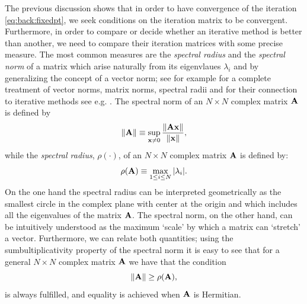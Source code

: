 The previous discussion shows that in order to have convergence of the iteration \eqref{eq:back:fixedpt}, we seek conditions on the iteration matrix to be convergent. Furthermore, in order to compare or decide whether an iterative method is better than another, we need to compare their iteration matrices with some precise measure. The most common measures are the \emph{spectral radius} and the \emph{spectral norm} of a matrix which arise naturally from its eigenvlaues $\lambda_i$ and by generalizing the concept of a vector norm; see for example \cite{HorJoh91} for a complete treatment of vector norms, matrix norms, spectral radii and for their connection to iterative methods see e.g. \cite{Ste01}. The spectral norm of an $N\times N$ complex matrix $\mathbf{A}$ is defined by
\begin{equation*}
\|\mathbf{A}\|\equiv\sup_{\mathbf{x}\neq 0}\frac{\|\mathbf{A}\mathbf{x}\|}{\|\mathbf{x}\|},
\end{equation*}
while the \emph{spectral radius}, $\rho(\cdot)$, of an $N\times N$ complex matrix $\mathbf{A}$ is defined by:
\begin{equation*}
\rho(\mathbf{A})\equiv\max_{1\leq i\leq N}|\lambda_i|.
\end{equation*}
On the one hand the spectral radius can be interpreted geometrically as the smallest circle in the complex plane with center at the origin and which includes all the eigenvalues of the matrix $\mathbf{A}$. The spectral norm, on the other hand, can be intuitively understood as the maximum `scale' by which a matrix can `stretch' a vector. Furthermore, we can relate both quantities; using the sumbultiplicativity property of the spectral norm it is easy to see that for a general $N\times N$ complex matrix $\mathbf{A}$ we have that the condition
\begin{equation*}
\|\mathbf{A}\|\geq \rho(\mathbf{A}),
\label{eq:back:norm_and_rad}
\end{equation*}
is always fulfilled, and equality is achieved when $\mathbf{A}$ is Hermitian.

